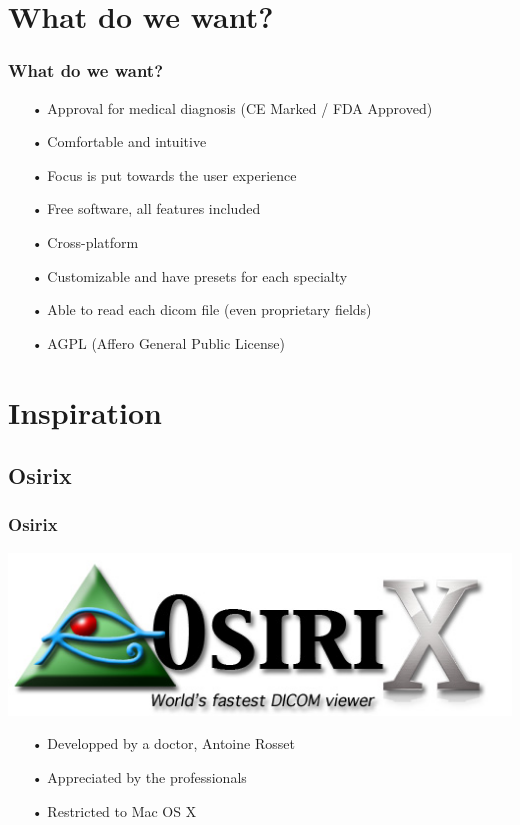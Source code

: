 \documentclass[11pt]{beamer}
\begin{document}
\section{What do we want?}

\begin{frame}
\frametitle{What do we want?}
\begin{itemize}
\item[•] Approval for medical diagnosis (CE Marked / FDA Approved)
\item[•] Comfortable and intuitive
\item[•] Focus is put towards the user experience
\item[•] Free software, all features included
\item[•] Cross-platform
\item[•] Customizable and have presets for each specialty
\item[•] Able to read each dicom file (even proprietary fields)
\item[•] AGPL (Affero General Public License)
\end{itemize}
\end{frame}

\section{Inspiration}

\subsection{Osirix}

\begin{frame}
\frametitle{Osirix}
\includegraphics[scale=0.17]{Osirix.jpg}
\begin{itemize}
\item[•] Developped by a doctor, Antoine Rosset
\item[•] Appreciated by the professionals
\item[•] Restricted to Mac OS X
\end{itemize}
\end{frame}
\end{document}
